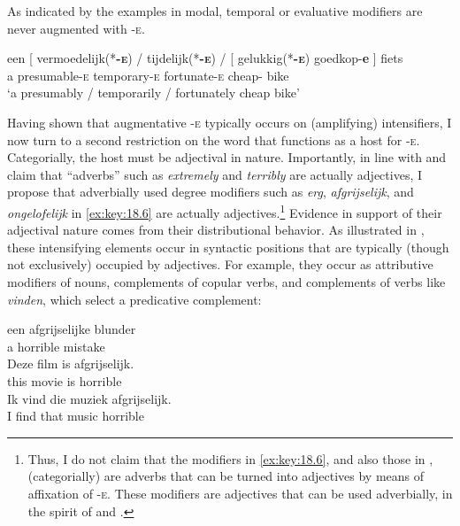 \documentclass[output=paper]{langsci/langscibook}
\begin{document}
As indicated by the examples in  modal, temporal or evaluative
modifiers are never augmented with \textsc{-e}.

\ea%
    \label{ex:key:18.13}
    \sn
    \gll een [ vermoedelijk(*\textbf{\textsc{-e}})  /  tijdelijk(*\textbf{\textsc{-e}})    /  [ gelukkig(*\textbf{\textsc{-e}})    goedkop-\textbf{e} ] fiets\\
    a  {}    presumable-\textsc{e}  {}  temporary-\textsc{e} {} {} fortunate-\textsc{e}  cheap-\Agr{} {} bike\\
    \glt \enquote*{a presumably / temporarily / fortunately cheap bike}
\z

Having shown that augmentative -\textsc{e} typically occurs on (amplifying)
intensifiers, I now turn to a second restriction on the word that functions as
a host for \textsc{-e}. Categorially, the host must be adjectival in nature.
Importantly, in line with  and  claim
that  \enquote{adverbs} such as \emph{extremely} and \emph{terribly} are
actually adjectives, I propose that adverbially used degree modifiers such as
\emph{erg}, \emph{afgrijselijk}, and \emph{ongelofelijk} in \eqref{ex:key:18.6} are
actually adjectives.\footnote{Thus, I do not claim that the modifiers in
\eqref{ex:key:18.6}, and also those in , (categorially) are adverbs
that can be turned into adjectives by means of affixation of \textsc{-e}. These
modifiers are adjectives that can be used adverbially, in the spirit of
\citet{Bowers1975} and \citet{Emonds1976}.} Evidence in support of their
adjectival nature comes from their distributional behavior. As illustrated in
, these intensifying elements occur in syntactic positions that
are typically (though not exclusively) occupied by adjectives. For example,
they occur as attributive modifiers of nouns, complements of copular
verbs, and
complements of verbs like \emph{vinden}, which  select a predicative
complement:

\ea%
    \label{ex:key:18.14}
	\ea
	\gll  een    afgrijselijke  blunder\\
		 a        horrible          mistake\\
	\ex
	\gll  Deze    film      is    afgrijselijk.\\
		this      movie  is    horrible\\
	\ex
	\gll Ik    vind    die    muziek    afgrijselijk.\\
		  I      find    that  music    horrible\\
	\z
\z
\end{document}

